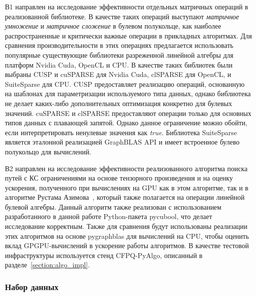 В1 направлен на исследование эффективности отдельных матричных операций в реализованной библиотеке. В качестве таких операций выступают \textit{матричное умножение} и \textit{матричное сложение} в булевом полукольце, как наиболее распространенные и критически важные операции в прикладных алгоритмах. Для сравнения производительности в этих операциях предлагается использовать популярные существующие библиотеки разреженной линейной алгебры для платформ Nvidia Cuda, OpenCL и CPU. В качестве таких библиотек были выбраны CUSP и cuSPARSE для Nvidia Cuda, clSPARSE для OpenCL, и SuiteSparse для CPU. CUSP предоставляет реализацию операций, основанную на шаблонах для параметризации используемого типа данных, однако библиотека не делает каких-либо дополнительных оптимизация конкретно для булевых значений. cuSPARSE и clSPARSE предоставляют операции только для основных типов данных с плавающей запятой. Однако данное ограничение можно обойти, если интерпретировать ненулевые значения как \textit{true}. Библиотека SuiteSparse является эталонной реализацией GraphBLAS API и имеет встроенное булево полукольцо для вычислений.

В2 направлен на исследование эффективности реализованного алгоритма поиска путей с КС ограничениями на основе тензорного произведения и на оценку ускорения, полученного при вычислениях на GPU как в этом алгоритме, так и в алгоритме Рустама Азимова~\cite{inproceedings:cfqp_matrix_with_single_source}, который также полагается на операции линейной булевой алгебры. Данный алгоритм также реализован с использованием разработанного в данной работе Python-пакета pycubool, что делает исследование корректным. Также для сравнения будут использованы реализации этих алгоритмов на основе pygraphblas для вычислений на CPU, чтобы оценить вклад GPGPU-вычислений в ускорение работы алгоритмов. В качестве тестовой инфраструктуры используется стенд CFPQ-PyAlgo, описанный в разделе~\ref{section:algo_impl}. 

\subsubsection*{Набор данных}

